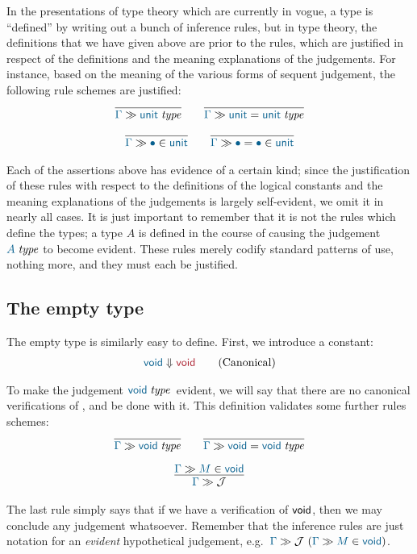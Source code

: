 In the presentations of type theory which are currently in vogue, a type is
``defined'' by writing out a bunch of inference rules, but in type theory, the
definitions that we have given above are prior to the rules, which are
justified in respect of the definitions and the meaning explanations of the
judgements. For instance, based on the meaning of the various forms of sequent
judgement, the following rule schemes are justified:
\begin{gather*}
  \infer{
    \sequent\Gamma\isset\tyunit
  }{
  }\qquad
  \infer{
    \sequent\Gamma\eisset{\tyunit}{\tyunit}
  }{
  }\\[6pt]
  \infer{
    \sequent\Gamma\ver\bullet\tyunit
  }{
  }\qquad
  \infer{
    \sequent\Gamma\ever{\bullet}{\bullet}{\tyunit}
  }{
  }
\end{gather*}

Each of the assertions above has evidence of a certain kind; since the
justification of these rules with respect to the definitions of the logical
constants and the meaning explanations of the judgements is largely
self-evident, we omit it in nearly all cases. It is just important to remember
that it is not the rules which define the types; a type $A$ is defined in the
course of causing the judgement $\isset{A}$ to become evident.  These rules
merely codify standard patterns of use, nothing more, and they must each be
justified.

\subsection{The empty type}

The empty type is similarly easy to define. First, we introduce a constant:
\begin{gather*}
  \reduce\tyvoid\tyvoid\tag{Canonical}
\end{gather*}

To make the judgement $\isset\tyvoid$\ evident, we will say that there are no
canonical verifications of \tyvoid, and be done with it. This definition
validates some further rules schemes:
\begin{gather*}
  \infer{
    \sequent\Gamma\isset\tyvoid
  }{
  }\qquad
  \infer{
    \sequent\Gamma\eisset{\tyvoid}{\tyvoid}
  }{
  }\\[6pt]
  \infer{
    \sequent\Gamma\mathcal{J}
  }{
    \sequent\Gamma\ver{M}{\tyvoid}
  }
\end{gather*}

The last rule simply says that if we have a verification of $\mathsf{void}$, then we
may conclude any judgement whatsoever. Remember that the inference rules are
just notation for an \emph{evident} hypothetical judgement, e.g.\
$\hyp{\sequent{\Gamma}\mathcal{J}}{\sequent\Gamma\ver{M}{\tyvoid}}$.

